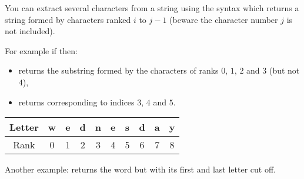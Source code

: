 \documentclass[11pt,class=report,crop=false]{standalone}
\begin{document}

\begin{cours}[Substrings]
\sauteligne

You can extract several characters from a string using the syntax  which returns a string formed by characters ranked $i$ to $j-1$ (beware the character number $j$ is not included).

For example if  then:
\begin{itemize}
  \item {} returns the  substring formed by the characters of ranks $0$, $1$, $2$ and $3$ (but not $4$),
  \item {} returns  corresponding to indices $3$, $4$ and $5$.
\end{itemize}  

\begin{center}
\begin{tabular}{|c|||c|c|c|c|c|c|c|c|c|}
\hline
Letter & w & e & d & n & e & s & d & a & y \\ \hline
Rank   & 0 & 1 & 2 & 3 & 4 & 5 & 6 & 7 & 8 \\ \hline
\end{tabular}
\end{center}
 
Another example:  returns the word but with its first and last letter cut off.
\end{cours}


\end{document}
